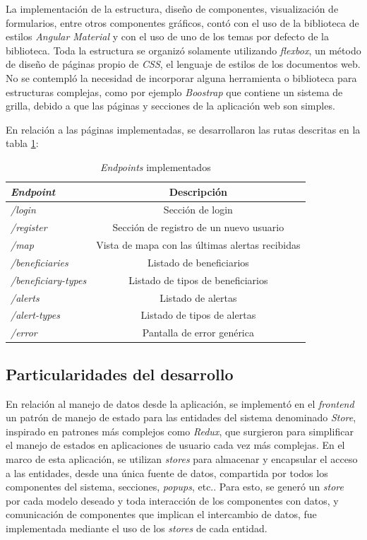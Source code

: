 La implementación de la estructura, diseño de componentes, visualización de formularios, entre otros componentes gráficos, contó con el uso de la biblioteca de estilos \textit{Angular Material} y con el uso de uno de los temas por defecto de la biblioteca. Toda la estructura se organizó solamente utilizando \textit{flexbox}, un método de diseño de páginas propio de \textit{CSS}, el lenguaje de estilos de los documentos web\citep{CSS:1}. No se contempló la necesidad de incorporar alguna herramienta o biblioteca para estructuras complejas, como por ejemplo \textit{Boostrap} que contiene un sistema de grilla\citep{BOOTSTRAP:1}, debido a que las páginas y secciones de la aplicación web son simples.

En relación a las páginas implementadas, se desarrollaron las rutas descritas en la tabla \ref{tab:frontend:pages}:

\begin{table}[H]
	\centering
	\caption[\textit{Servicios}]{\textit{Endpoints} implementados}
	\begin{tabular}{l c}    
		\toprule
		\textbf{\textit{Endpoint}} 	 & \textbf{Descripción} \\
		\midrule
		\textit{/login} & Sección de login  \\	
		\textit{/register} & Sección de registro de un nuevo usuario \\		
		\textit{/map} & Vista de mapa con las últimas alertas recibidas  \\
		\textit{/beneficiaries} & Listado de beneficiarios  \\	
		\textit{/beneficiary-types} & Listado de tipos de beneficiarios  \\		
		\textit{/alerts} & Listado de alertas  \\
		\textit{/alert-types} & Listado de tipos de alertas  \\
		\textit{/error} & Pantalla de error genérica  \\	
		\bottomrule
		\hline
	\end{tabular}
	\label{tab:frontend:pages}
\end{table}

\subsection{Particularidades del desarrollo}

En relación al manejo de datos desde la aplicación, se implementó en el \textit{frontend} un patrón de manejo de estado para las entidades del sistema denominado \textit{Store}, inspirado en patrones más complejos como \textit{Redux}, que surgieron para simplificar el manejo de estados en aplicaciones de usuario cada vez más complejas\citep{REDUX:1}. En el marco de esta aplicación, se utilizan \textit{stores} para almacenar y encapsular el acceso a las entidades, desde una única fuente de datos, compartida por todos los componentes del sistema, secciones, \textit{popups}, etc.\citep{ANGULAR:6}. Para esto, se generó un \textit{store} por cada modelo deseado y toda interacción de los componentes con datos, y comunicación de componentes que implican el intercambio de datos, fue implementada mediante el uso de los \textit{stores} de cada entidad.

